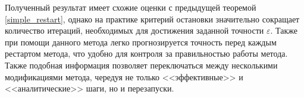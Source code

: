     Полученный результат имеет схожие оценки с предыдущей теоремой \ref{simple_restart}, однако на практике критерий остановки значительно сокращает количество итераций, необходимых для достижения заданной точности $\varepsilon$. Также при помощи данного метода легко прогнозируется точность перед каждым рестартом метода, что удобно для контроля за правильностью работы метода. Также подобная информация позволяет переключаться между несколькими модификациями метода, чередуя не только <<эффективные>> и <<аналитические>> шаги, но и перезапуски.  
\FloatBarrier